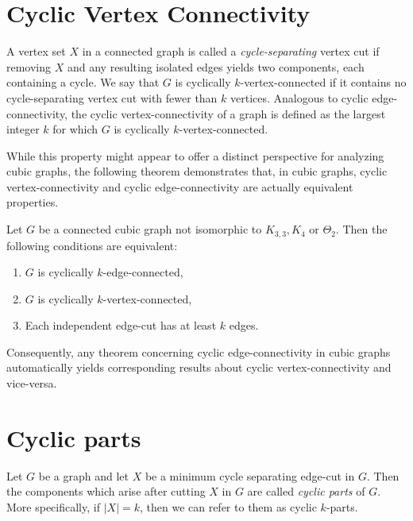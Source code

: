 \documentclass[12pt, twoside]{book}
\begin{document}
\section{Cyclic Vertex Connectivity}

A vertex set $X$ in a connected graph is called a \textit{cycle-separating} vertex cut if removing $X$ and any resulting isolated edges yields two components, each containing a cycle. We say that $G$ is cyclically $k$-vertex-connected if it contains no cycle-separating vertex cut with fewer than $k$ vertices. Analogous to cyclic edge-connectivity, the cyclic vertex-connectivity of a graph is defined as the largest integer $k$ for which $G$ is cyclically $k$-vertex-connected.

While this property might appear to offer a distinct perspective for analyzing cubic graphs, the following theorem demonstrates that, in cubic graphs, cyclic vertex-connectivity and cyclic edge-connectivity are actually equivalent properties.

\begin{theorem}
	Let $G$ be a connected cubic graph not isomorphic to $K_{3,3},K_4$ or $\Theta_2$. Then the following conditions are equivalent:
	\begin{enumerate}
		\item $G$ is cyclically $k$-edge-connected,
		\item $G$ is cyclically $k$-vertex-connected,
		\item Each independent edge-cut has at least $k$ edges.
	\end{enumerate}
\end{theorem}

Consequently, any theorem concerning cyclic edge-connectivity in cubic graphs automatically yields corresponding results about cyclic vertex-connectivity and vice-versa.

\section{Cyclic parts}\label{sec:cyclic-parts}

\begin{definition}
	Let $G$ be a graph and let $X$ be a minimum cycle separating edge-cut in $G$. Then the components which arise after cutting $X$ in $G$ are called \textit{cyclic parts} of $G$. More specifically, if $|X|=k$, then we can refer to them as cyclic $k$-parts.
\end{definition}
\end{document}
